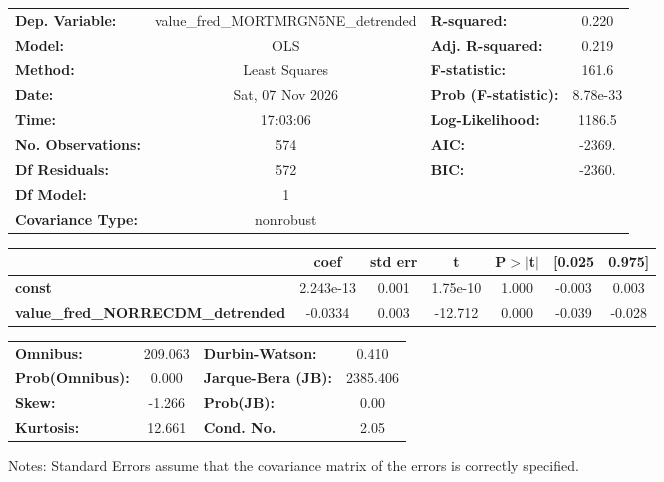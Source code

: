 \begin{center}
\begin{tabular}{lclc}
\toprule
\textbf{Dep. Variable:}                   & value\_fred\_MORTMRGN5NE\_detrended & \textbf{  R-squared:         } &     0.220   \\
\textbf{Model:}                           &                 OLS                 & \textbf{  Adj. R-squared:    } &     0.219   \\
\textbf{Method:}                          &            Least Squares            & \textbf{  F-statistic:       } &     161.6   \\
\textbf{Date:}                            &           Sat, 07 Nov 2026          & \textbf{  Prob (F-statistic):} &  8.78e-33   \\
\textbf{Time:}                            &               17:03:06              & \textbf{  Log-Likelihood:    } &    1186.5   \\
\textbf{No. Observations:}                &                   574               & \textbf{  AIC:               } &    -2369.   \\
\textbf{Df Residuals:}                    &                   572               & \textbf{  BIC:               } &    -2360.   \\
\textbf{Df Model:}                        &                     1               & \textbf{                     } &             \\
\textbf{Covariance Type:}                 &              nonrobust              & \textbf{                     } &             \\
\bottomrule
\end{tabular}
\begin{tabular}{lcccccc}
                                          & \textbf{coef} & \textbf{std err} & \textbf{t} & \textbf{P$> |$t$|$} & \textbf{[0.025} & \textbf{0.975]}  \\
\midrule
\textbf{const}                            &    2.243e-13  &        0.001     &  1.75e-10  &         1.000        &       -0.003    &        0.003     \\
\textbf{value\_fred\_NORRECDM\_detrended} &      -0.0334  &        0.003     &   -12.712  &         0.000        &       -0.039    &       -0.028     \\
\bottomrule
\end{tabular}
\begin{tabular}{lclc}
\textbf{Omnibus:}       & 209.063 & \textbf{  Durbin-Watson:     } &    0.410  \\
\textbf{Prob(Omnibus):} &   0.000 & \textbf{  Jarque-Bera (JB):  } & 2385.406  \\
\textbf{Skew:}          &  -1.266 & \textbf{  Prob(JB):          } &     0.00  \\
\textbf{Kurtosis:}      &  12.661 & \textbf{  Cond. No.          } &     2.05  \\
\bottomrule
\end{tabular}
\end{center}

Notes: \newline
 [1] Standard Errors assume that the covariance matrix of the errors is correctly specified.
